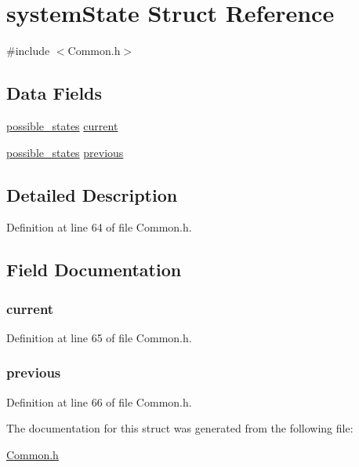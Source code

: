 \hypertarget{structsystem_state}{\section{system\+State Struct Reference}
\label{structsystem_state}
}


{\ttfamily \#include $<$Common.\+h$>$}

\subsection*{Data Fields}
\begin{DoxyCompactItemize}
\item 
\hyperlink{_common_8h_a05931287b056487cf89495f39026fbe1}{possible\+\_\+states} \hyperlink{structsystem_state_a18284a4a782e71c070e1d2e80734509d}{current}
\item 
\hyperlink{_common_8h_a05931287b056487cf89495f39026fbe1}{possible\+\_\+states} \hyperlink{structsystem_state_af2f2716b4afa23c8b53a9351a0924b6b}{previous}
\end{DoxyCompactItemize}


\subsection{Detailed Description}


Definition at line 64 of file Common.\+h.



\subsection{Field Documentation}
\hypertarget{structsystem_state_a18284a4a782e71c070e1d2e80734509d}{
\subsubsection[{current}]{ current}}\label{structsystem_state_a18284a4a782e71c070e1d2e80734509d}


Definition at line 65 of file Common.\+h.

\hypertarget{structsystem_state_af2f2716b4afa23c8b53a9351a0924b6b}{
\subsubsection[{previous}]{ previous}}\label{structsystem_state_af2f2716b4afa23c8b53a9351a0924b6b}


Definition at line 66 of file Common.\+h.



The documentation for this struct was generated from the following file\+:\begin{DoxyCompactItemize}
\item 
\hyperlink{_common_8h}{Common.\+h}\end{DoxyCompactItemize}
